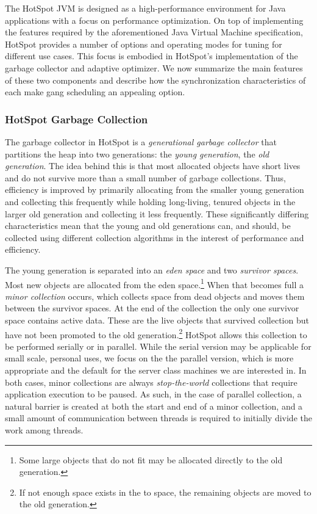 \documentclass{sig-alternate}
\begin{document}
The HotSpot JVM is designed as a high-performance environment for Java applications with a focus on performance optimization. On top of implementing the features required by the aforementioned Java Virtual Machine specification, HotSpot provides a number of options and operating modes for tuning for different use cases. This focus is embodied in HotSpot's implementation of the garbage collector and adaptive optimizer. We now summarize the main features of these two components and describe how the synchronization characteristics of each make gang scheduling an appealing option.

\subsubsection{HotSpot Garbage Collection}
The garbage collector in HotSpot is a \textit{generational garbage collector} \cite{hotspot:memory} that partitions the heap into two generations: the \textit{young generation}, the \textit{old generation}. The idea behind this is that most allocated objects have short lives and do not survive more than a small number of garbage collections. Thus, efficiency is improved by primarily allocating from the smaller young generation and collecting this frequently while holding long-living, tenured objects in the larger old generation and collecting it less frequently. These significantly differing characteristics mean that the young and old generations can, and should, be collected using different collection algorithms in the interest of performance and efficiency.

The young generation is separated into an \textit{eden space} and two \textit{survivor spaces}. Most new objects are allocated from the eden space.\footnote{Some large objects that do not fit may be allocated directly to the old generation.} When that becomes full a \textit{minor collection} occurs, which collects space from dead objects and moves them between the survivor spaces. At the end of the collection the only one survivor space contains active data. These are the live objects that survived collection but have not been promoted to the old generation.\footnote{If not enough space exists in the to space, the remaining objects are moved to the old generation.} HotSpot allows this collection to be performed serially or in parallel. While the serial version may be applicable for small scale, personal uses, we focus on the the parallel version, which is more appropriate and the default for the server class machines we are interested in. In both cases, minor collections are always \textit{stop-the-world} collections that require application execution to be paused. As such, in the case of parallel collection, a natural barrier is created at both the start and end of a minor collection, and a small amount of communication between threads is required to initially divide the work among threads.
\end{document}
